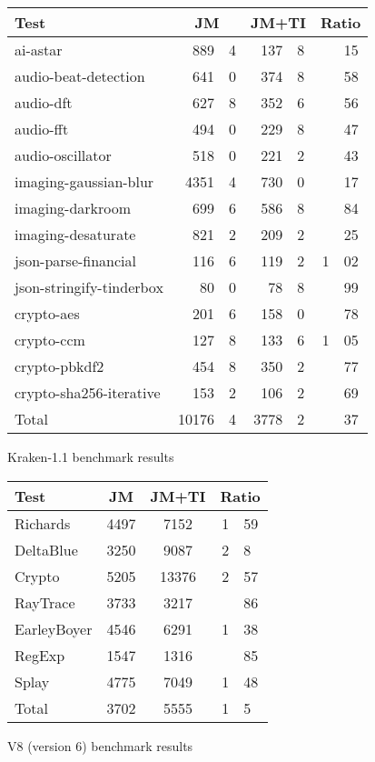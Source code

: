 \begin{figure}
\begin{center}
\begin{tabular}{|l|r@{.}lr@{.}l|r@{.}l|}
\hline
Test & \multicolumn{2}{|c|}{JM}
     & \multicolumn{2}{|c|}{JM+TI}
     & \multicolumn{2}{|c|}{Ratio} \\
\hline
ai-astar & 889&4 & 137&8 & &15 \\
audio-beat-detection & 641&0 & 374&8 & &58 \\
audio-dft & 627&8 & 352&6 & &56 \\
audio-fft & 494&0 & 229&8 & &47 \\
audio-oscillator & 518&0 & 221&2 & &43 \\
imaging-gaussian-blur & 4351&4 & 730&0 & &17 \\
imaging-darkroom & 699&6 & 586&8 & &84 \\
imaging-desaturate & 821&2 & 209&2 & &25 \\
json-parse-financial & 116&6 & 119&2 & 1&02 \\
json-stringify-tinderbox & 80&0 & 78&8 & &99 \\
crypto-aes & 201&6 & 158&0 & &78 \\
crypto-ccm & 127&8 & 133&6 & 1&05 \\
crypto-pbkdf2 & 454&8 & 350&2 & &77 \\
crypto-sha256-iterative & 153&2 & 106&2 & &69 \\
\hline
Total & 10176&4 & 3778&2 & &37 \\
\hline
\end{tabular}
\end{center}
\caption{Kraken-1.1 benchmark results}
\end{figure}

\begin{figure}
\begin{center}
\begin{tabular}{|l|cc|r@{.}l|}
\hline
Test & JM & JM+TI & \multicolumn{2}{|c|}{Ratio} \\
\hline
Richards & 4497 & 7152 & 1&59 \\
DeltaBlue & 3250 & 9087 & 2&8 \\
Crypto & 5205 & 13376 & 2&57 \\
RayTrace & 3733 & 3217 & &86 \\
EarleyBoyer & 4546 & 6291 & 1&38 \\
RegExp & 1547 & 1316 & &85 \\
Splay & 4775 & 7049 & 1&48 \\
\hline
Total & 3702 & 5555 & 1&5 \\
\hline
\end{tabular}
\end{center}
\caption{V8 (version 6) benchmark results}
\end{figure}

